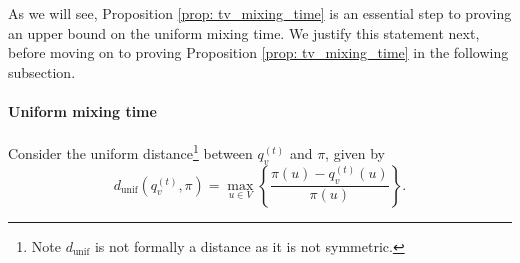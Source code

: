 \documentclass{article}
\newcommand{\set}[1]{\left\{#1\right\}}
\newcommand{\1}{\mathbf{1}}
\theoremstyle{aldenthm}
\theoremstyle{aldenrmrk}
\begin{document}
As we will see, Proposition \ref{prop: tv_mixing_time} is an essential step to proving an upper bound on the uniform mixing time. We justify this statement next, before moving on to proving Proposition \ref{prop: tv_mixing_time} in the following subsection.

\paragraph{Uniform mixing time}
Consider the uniform distance\footnote{Note $d_{\textrm{unif}}$ is not formally a distance as it is not symmetric.} between $q_v^{(t)}$ and $\pi$, given by
\begin{equation*}
d_{\textrm{unif}}(q_v^{(t)},\pi) = \max_{u \in V} \set{\frac{\pi(u) - q_v^{(t)}(u)}{\pi(u)}}.
\end{equation*}
\end{document}

